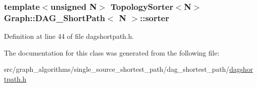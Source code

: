 \subsubsection[{sorter}]{\setlength{\rightskip}{0pt plus 5cm}template$<$unsigned N$>$ Topology\+Sorter$<$N$>$ {\bf Graph\+::\+D\+A\+G\+\_\+\+Short\+Path}$<$ N $>$\+::sorter\hspace{0.3cm}{\ttfamily [private]}}\label{class_graph_1_1_d_a_g___short_path_abc5a032ce3ec9a62f01d31447de4e2f2}


Definition at line 44 of file dagshortpath.\+h.



The documentation for this class was generated from the following file\+:\begin{DoxyCompactItemize}
\item 
src/graph\+\_\+algorithms/single\+\_\+source\+\_\+shortest\+\_\+path/dag\+\_\+shortest\+\_\+path/\hyperlink{dagshortpath_8h}{dagshortpath.\+h}\end{DoxyCompactItemize}
